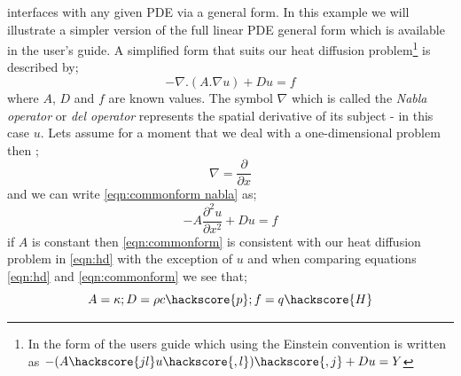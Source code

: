 \ESCRIPT interfaces with any given PDE via a general form. In this example we will illustrate a simpler version of the full linear PDE general form which is available in the \ESCRIPT user's guide. A simplified form that suits our heat diffusion problem\footnote{In the form of the \ESCRIPT users guide which using the Einstein convention is written as 
$-(A\hackscore{jl} u\hackscore{,l})\hackscore{,j}+D u =Y$}
is described by;
\begin{equation}\label{eqn:commonform nabla}
-\nabla.(A.\nabla u) + Du = f
\end{equation}
where $A$, $D$ and $f$ are known values. The symbol $\nabla$ which is called the \textit{Nabla operator} or \textit{del operator} represents
the spatial derivative of its subject - in this case $u$. Lets assume for a moment that we deal with a one-dimensional problem then ;
\begin{equation}
\nabla = \frac{\partial}{\partial x}
\end{equation}
and we can write \ref{eqn:commonform nabla} as;
\begin{equation}\label{eqn:commonform}
-A\frac{\partial^{2}u}{\partial x^{2}} + Du = f
\end{equation}
if $A$ is constant then  \ref{eqn:commonform} is consistent with our heat diffusion problem in \ref{eqn:hd} with the exception of $u$ and when comparing equations \ref{eqn:hd} and \ref{eqn:commonform} we see that;
\begin{equation}
A = \kappa; D = \rho c \hackscore{p}; f = q \hackscore{H}
\end{equation}

